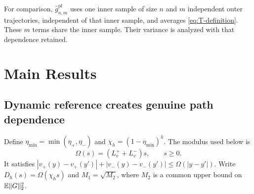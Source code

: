 \documentclass[11pt]{article}
\newcommand{\E}{\mathbb E}
\newcommand{\1}{\mathbf 1}
\DeclarePairedDelimiter{\norm}{\lVert}{\rVert}
\newcommand{\pl}{\mathrm{pl}}
\theoremstyle{definition}
\begin{document}
For comparison, $\widehat g_{n,m}^{\pl}$ uses one inner sample of size $n$ and $m$ independent outer trajectories, independent of that inner sample, and averages \eqref{eq:T-definition}. These $m$ terms share the inner sample. Their variance is analyzed with that dependence retained.

\section{Main Results}\label{sec:results}
\subsection{Dynamic reference creates genuine path dependence}
Define $\eta_{\min}=\min(\eta_+,\eta_-)$ and $\chi_h=(1-\eta_{\min})^h$. The modulus used below is
\begin{equation}\label{eq:value-modulus}
 \Omega(s)=(L_v^++L_v^-)s,\qquad s\ge0.
\end{equation}
It satisfies $|v_+(y)-v_+(y')|+|v_-(y)-v_-(y')|\le\Omega(|y-y'|)$. Write $D_h(s)=\Omega(\chi_h s)$ and $M_1=\sqrt{M_2}$, where $M_2$ is a common upper bound on $\E\norm{G}_2^2$.
\end{document}
